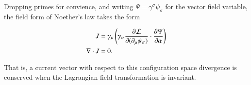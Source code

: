 \documentclass{article}
\begin{document}
Dropping primes for convience, and writing $\Psi = \gamma^\sigma \psi_\sigma$ for the vector field variable,
the field form of Noether's law takes the form

\begin{align}\label{eqn:NoethersVector}
J &= \gamma_\mu \left( \gamma_\sigma \frac{\partial {\mathcal{L}}}{\partial {(\partial_\mu \psi_\sigma)}} \cdot \frac{\partial {\Psi}}{\partial {\alpha}} \right) \\
\nabla \cdot J &= 0.
\end{align}

That is, a current vector with respect to this configuration space divergence is conserved when the Lagrangian field transformation is invariant.

\end{document}
